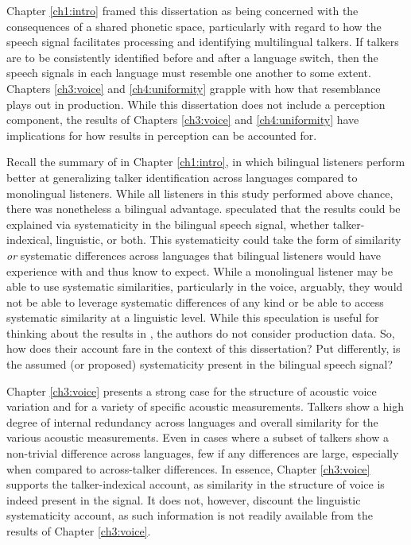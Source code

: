 Chapter \ref{ch1:intro} framed this dissertation as being concerned with the consequences of a shared phonetic space, particularly with regard to how the speech signal facilitates processing and identifying multilingual talkers. If talkers are to be consistently identified before and after a language switch, then the speech signals in each language must resemble one another to some extent. Chapters \ref{ch3:voice} and \ref{ch4:uniformity} grapple with how that resemblance plays out in production. While this dissertation does not include a perception component, the results of Chapters \ref{ch3:voice} and \ref{ch4:uniformity} have implications for how results in perception can be accounted for. 

Recall the summary of \citet{orena_2019_identifying} in Chapter \ref{ch1:intro}, in which bilingual listeners perform better at generalizing talker identification across languages compared to monolingual listeners. While all listeners in this study performed above chance, there was nonetheless a bilingual advantage. \citeauthor{orena_2019_identifying} speculated that the results could be explained via systematicity in the bilingual speech signal, whether talker-indexical, linguistic, or both. This systematicity could take the form of similarity \textit{or} systematic differences across languages that bilingual listeners would have experience with and thus know to expect. While a monolingual listener may be able to use systematic similarities, particularly in the voice, arguably, they would not be able to leverage systematic differences of any kind or be able to access systematic similarity at a linguistic level. While this speculation is useful for thinking about the results in \citet{orena_2019_identifying}, the authors do not consider production data. So, how does their account fare in the context of this dissertation? Put differently, is the assumed (or proposed) systematicity present in the bilingual speech signal? 

Chapter \ref{ch3:voice} presents a strong case for the structure of acoustic voice variation and for a variety of specific acoustic measurements. Talkers show a high degree of internal redundancy across languages and overall similarity for the various acoustic measurements. Even in cases where a subset of talkers show a non-trivial difference across languages, few if any differences are large, especially when compared to across-talker differences. In essence, Chapter \ref{ch3:voice} supports the talker-indexical account, as similarity in the structure of voice is indeed present in the signal. It does not, however, discount the linguistic systematicity account, as such information is not readily available from the results of Chapter \ref{ch3:voice}.

